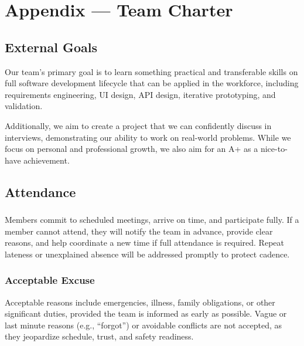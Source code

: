 \documentclass{article}
\begin{document}
\newpage{}
\section*{Appendix --- Team Charter}


\subsection*{External Goals}

Our team's primary goal is to learn something practical and transferable skills
on full software development lifecycle that can be applied in the workforce,
including requirements engineering, UI design, API design, iterative
prototyping, and validation.

Additionally, we aim to create a project that we can confidently discuss in
interviews, demonstrating our ability to work on real-world problems. While we
focus on personal and professional growth, we also aim for an A+ as a
nice-to-have achievement.

\subsection*{Attendance}

\subsubsection*{\color{blue}{Expectations}}

Members commit to scheduled meetings, arrive on time, and participate fully. If
a member cannot attend, they will notify the team in advance, provide clear
reasons, and help coordinate a new time if full attendance is required. Repeat
lateness or unexplained absence will be addressed promptly to protect cadence.

\subsubsection*{\color{blue}Acceptable Excuse}

Acceptable reasons include emergencies, illness, family obligations, or other
significant duties, provided the team is informed as early as possible. Vague
or last minute reasons (e.g., ``forgot'') or avoidable conflicts are not
accepted, as they jeopardize schedule, trust, and safety readiness.
\end{document}
